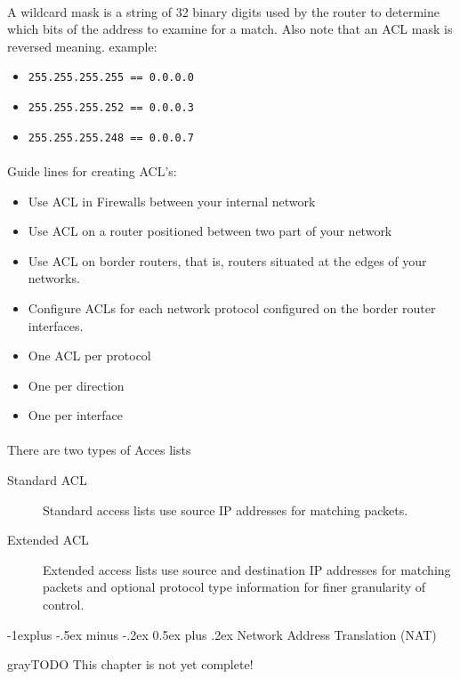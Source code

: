 \documentclass[10pt,landscape]{article}
\makeatletter
\renewcommand{\subsection}{\@startsection{subsection}{2}{0mm}%
                                {-1explus -.5ex minus -.2ex}%
                                {0.5ex plus .2ex}%
                                {\normalfont\normalsize\bfseries}}
\makeatother
\begin{document}
\begin{multicols}{3}
\paragraph{}
A wildcard mask is a string of 32 binary digits used by the router to determine which bits of the address to examine for a match. Also note that an ACL mask is reversed meaning.
example:
\begin{itemize}
	\item \verb!255.255.255.255 == 0.0.0.0!
	\item \verb!255.255.255.252 == 0.0.0.3!
	\item \verb!255.255.255.248 == 0.0.0.7!
\end{itemize}
\paragraph{}
Guide lines for creating ACL's:
\begin{itemize}
	\item Use ACL in Firewalls between your internal network
	\item Use ACL on a router positioned between two part of your network
	\item Use ACL on border routers, that is, routers situated at the edges of your networks.
	\item Configure ACLs for each network protocol configured on the border router interfaces.
	\item One ACL per protocol
	\item One per direction
	\item One per interface
\end{itemize}
\paragraph{}
There are two types of Acces lists
\begin{description}
	\item[Standard ACL] Standard access lists use source IP addresses for matching packets.
	\item[Extended ACL] Extended access lists use source and destination IP addresses for matching packets and optional protocol type information for finer granularity of control.
\end{description}

\subsection{Network Address Translation (NAT)}
\begin{textbox}{gray}{TODO}
	This chapter is not yet complete!
\end{textbox}


\end{multicols}
\end{document}
